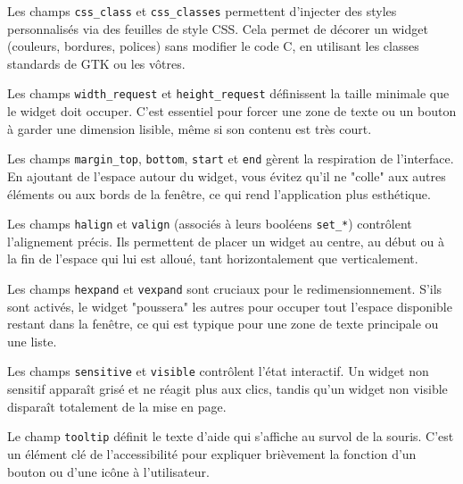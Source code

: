 \bigskip

Les champs \texttt{css\_class} et \texttt{css\_classes} permettent d'injecter des styles personnalisés via des feuilles de style CSS. Cela permet de décorer un widget (couleurs, bordures, polices) sans modifier le code C, en utilisant les classes standards de GTK ou les vôtres.

Les champs \texttt{width\_request} et \texttt{height\_request} définissent la taille minimale que le widget doit occuper. C'est essentiel pour forcer une zone de texte ou un bouton à garder une dimension lisible, même si son contenu est très court.

Les champs \texttt{margin\_top}, \texttt{bottom}, \texttt{start} et \texttt{end} gèrent la respiration de l'interface. En ajoutant de l'espace autour du widget, vous évitez qu'il ne "colle" aux autres éléments ou aux bords de la fenêtre, ce qui rend l'application plus esthétique.

Les champs \texttt{halign} et \texttt{valign} (associés à leurs booléens \texttt{set\_*}) contrôlent l'alignement précis. Ils permettent de placer un widget au centre, au début ou à la fin de l'espace qui lui est alloué, tant horizontalement que verticalement.

Les champs \texttt{hexpand} et \texttt{vexpand} sont cruciaux pour le redimensionnement. S'ils sont activés, le widget "poussera" les autres pour occuper tout l'espace disponible restant dans la fenêtre, ce qui est typique pour une zone de texte principale ou une liste.

Les champs \texttt{sensitive} et \texttt{visible} contrôlent l'état interactif. Un widget non sensitif apparaît grisé et ne réagit plus aux clics, tandis qu'un widget non visible disparaît totalement de la mise en page.

Le champ \texttt{tooltip} définit le texte d'aide qui s'affiche au survol de la souris. C'est un élément clé de l'accessibilité pour expliquer brièvement la fonction d'un bouton ou d'une icône à l'utilisateur.